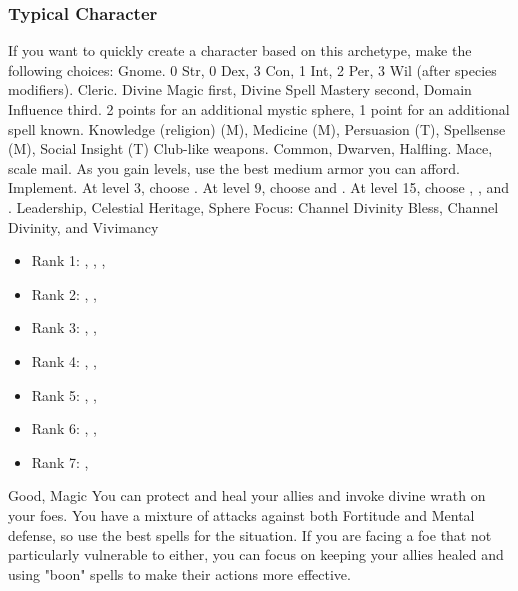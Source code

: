         \subsubsection{Typical Character}
            If you want to quickly create a character based on this archetype, make the following choices:
             Gnome.
             0 Str, 0 Dex, 3 Con, 1 Int, 2 Per, 3 Wil (after species modifiers).
             Cleric.
             Divine Magic first, Divine Spell Mastery second, Domain Influence third.
             2 points for an additional mystic sphere, 1 point for an additional spell known.
             Knowledge (religion) (M), Medicine (M), Persuasion (T), Spellsense (M), Social Insight (T)
             Club-like weapons.
             Common, Dwarven, Halfling.
             Mace, scale mail. As you gain levels, use the best medium armor you can afford.
             Implement.
                At level 3, choose .
                At level 9, choose  and .
                At level 15, choose , , and .
             Leadership, Celestial Heritage, Sphere Focus: Channel Divinity
             Bless, Channel Divinity, and Vivimancy
            \begin{itemize}
                \item Rank 1: , , , 
                \item Rank 2: , , 
                \item Rank 3: , , 
                \item Rank 4: , , 
                \item Rank 5: , , 
                \item Rank 6: , , 
                \item Rank 7: , 
            \end{itemize}
             Good, Magic
             You can protect and heal your allies and invoke divine wrath on your foes.
            You have a mixture of attacks against both Fortitude and Mental defense, so use the best spells for the situation.
            If you are facing a foe that not particularly vulnerable to either, you can focus on keeping your allies healed and using "boon" spells to make their actions more effective.

